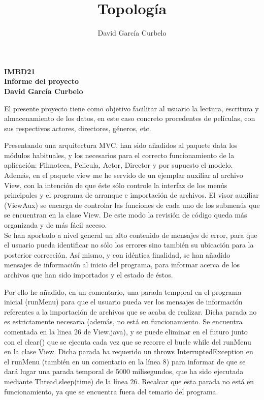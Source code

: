 \documentclass[fleqn]{article}
\author{David García Curbelo}
\title{Topología}
\begin{document}
    \doublespace

    \setcounter{page}{1}
    \pagestyle{plain}

    \begin{center}
        {\Large\bf{IMBD21}} \\
        {\large\bf{Informe del proyecto}} \\
        \bf{David García Curbelo}\\
        
    \end{center}

    El presente proyecto tiene como objetivo facilitar al usuario la lectura, escritura y almacenamiento de los datos,
    en este caso concreto procedentes de películas, con sus respectivos actores, directores, géneros, etc.

    Presentando una arquitectura MVC, han sido añadidos al paquete data los módulos habituales, y los necesarios para 
    el correcto funcionamiento de la aplicación: Filmoteca, Pelicula, Actor, Director y por supuesto el modelo. 
    Además, en el paquete view me he servido 
    de un ejemplar auxiliar al archivo View, con la intención de que éste sólo controle la interfaz de los menús principales
    y el programa de arranque e importación de archivos. El visor auxiliar (ViewAux) se encarga de controlar las funciones de cada 
    uno de los submenús que se encuentran en la clase View. De este modo la revisión de código queda más organizada y de más 
    fácil acceso.\\
    
    Se han aportado a nivel general un alto contenido de mensajes de error, para que el usuario pueda identificar no sólo los 
    errores sino también su ubicación para la posterior corrección. Así mismo, y con idéntica finalidad, se han añadido mensajes 
    de información al inicio del programa, para informar acerca de los archivos que han sido importados y el estado de éstos. 
    
    Por ello he añadido, en un comentario, una parada temporal en el programa inicial (runMenu) para que el usuario pueda ver 
    los mensajes de información referentes a la importación de archivos que se acaba de realizar.
    Dicha parada no es estrictamente necesaria (además, no está en funcionamiento. Se encuentra comentada en la linea 26 de 
    View.java), y se puede eliminar en el futuro junto con el clear() que se ejecuta cada vez que se recorre
    el bucle while del runMenu en la clase View. Dicha parada ha requerido un throws InterruptedException en el runMenu 
    (también en un comentario en la línea 8) para informar de que se dará lugar una parada temporal de 5000 milisegundos, 
    que ha sido ejecutada mediante Thread.sleep(time) de la línea 26. Recalcar que esta parada no está en funcionamiento, 
    ya que se encuentra fuera del temario del programa. \\
\end{document}
